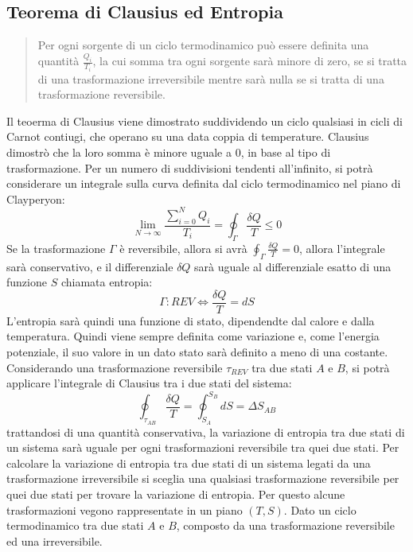 \documentclass{article}
\numberwithin{equation}{subsection}
\begin{document}
\subsection{Teorema di Clausius ed Entropia}
\begin{quotation}
    Per ogni sorgente di un ciclo termodinamico può essere definita una quantità $\displaystyle\frac{Q_i}{T_i}$, la cui somma tra ogni sorgente sarà minore di zero, se si tratta di una 
    trasformazione irreversibile mentre sarà nulla se si tratta di una trasformazione reversibile. 
\end{quotation}
Il teoerma di Clausius viene dimostrato suddividendo un ciclo qualsiasi in cicli di Carnot contiugi, che operano su una data coppia di temperature. Clausius dimostrò che 
la loro somma è minore uguale a $0$, in base al tipo di trasformazione. Per un numero di suddivisioni tendenti all'infinito, si potrà considerare un integrale sulla curva 
definita dal ciclo termodinamico nel piano di Clayperyon:
\begin{equation}
    \lim_{N\to\infty}\displaystyle\frac{\sum_{i=0}^NQ_i}{T_i}=\oint_{\Gamma}\frac{\delta Q}{T}\leq0
\end{equation}
Se la trasformazione $\Gamma$ è reversibile, allora si avrà $\oint_{\Gamma}\frac{\delta Q}{T}=0$, allora l'integrale sarà conservativo, e 
il differenziale $\delta Q$ sarà uguale al differenziale esatto di una funzione $S$ chiamata entropia:
\begin{equation}
    \Gamma:REV\iff\displaystyle\frac{\delta Q}{T} =dS
\end{equation} 
L'entropia sarà quindi una funzione di stato, dipendendte dal calore e dalla temperatura. Quindi viene sempre definita come variazione e, come l'energia potenziale, il suo 
valore in un dato stato sarà definito a meno di una costante. Considerando una trasformazione reversibile $\tau_{REV}$ tra due stati $A$ e $B$, si potrà applicare 
l'integrale di Clausius tra i due stati del sistema:
\begin{equation}
    \oint_{\tau_{AB}}\displaystyle\frac{\delta Q}{T}=\oint_{S_A}^{S_B}dS=\Delta S_{AB}
\end{equation}
trattandosi di una quantità conservativa, la variazione di entropia tra due stati di un sistema sarà uguale per ogni trasformazioni reversibile tra quei due stati. Per 
calcolare la variazione di entropia tra due stati di un sistema legati da una trasformazione irreversibile si sceglia una qualsiasi trasformazione reversibile per 
quei due stati per trovare la variazione di entropia.
Per questo alcune trasformazioni vegono rappresentate in un piano $(T,S)$. 
Dato un ciclo termodinamico tra due stati $A$ e $B$, composto da una trasformazione reversibile ed una irreversibile.
\end{document}
